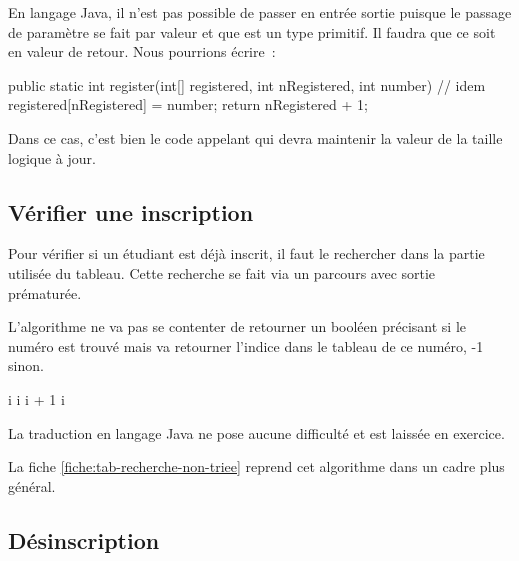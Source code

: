 			En langage Java, il n'est pas possible de passer  en 
			entrée sortie puisque le passage de paramètre se fait par valeur et 
			que  est un type primitif. Il faudra que ce soit en valeur de 
			retour. Nous pourrions écrire~:

			\begin{java}
	public static int register(int[] registered, int nRegistered,
			int number){
		// idem
		registered[nRegistered] = number;
		return nRegistered + 1;
	}
			\end{java}

			Dans ce cas, c'est bien le code appelant qui devra maintenir la 
			valeur de la taille logique à jour. 
		
		\subsection{Vérifier une inscription}
	
			Pour vérifier si un étudiant est déjà inscrit,
			il faut le rechercher dans la partie utilisée du tableau.
			Cette recherche se fait via un parcours avec sortie
			prématurée. 
			
			L'algorithme ne va pas se contenter de retourner un booléen
			précisant si le numéro est trouvé mais va retourner l'indice dans le
			tableau de ce numéro, -1 sinon. 
			
			\begin{pseudocode}
					\Let i 
						\Let i \Gets i + 1
					\EndWhile
						\Return i
					\Else
					\EndIf
				\EndAlgo
			\end{pseudocode}

			La traduction en langage Java ne pose aucune difficulté et est
			laissée en exercice. 
			
			La fiche \vref{fiche:tab-recherche-non-triee} reprend cet algorithme
			dans un cadre plus général.

		\subsection{Désinscription}
		
